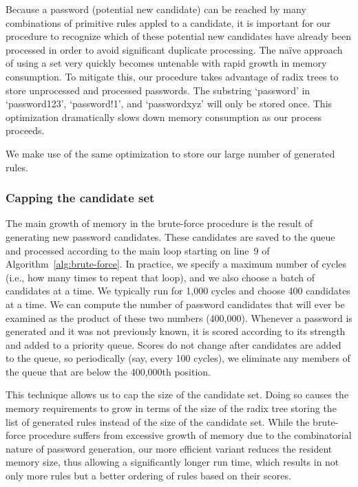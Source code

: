 \documentclass[letterpaper,twocolumn,10pt]{article}
\begin{document}
Because a password (potential new candidate) can be reached by many
combinations of primitive rules appled to a candidate, it is important for our
procedure to recognize which of these potential new candidates have already been
processed in order to avoid significant duplicate processing. The naïve approach
of using a set very quickly becomes untenable with rapid growth in memory
consumption. To mitigate this, our procedure takes advantage of radix trees to
store unprocessed and processed passwords. The substring `password' in
`password123', `password!1', and `passwordxyz' will only be stored once. This
optimization dramatically slows down memory consumption as our process proceeds.

We make use of the same optimization to store our large number of generated
rules.

\subsubsection{Capping the candidate set}

The main growth of memory in the brute-force procedure is the result of
generating new password candidates. These candidates are saved to the queue and
processed according to the main loop starting on line~9 of
Algorithm~\ref{alg:brute-force}. In practice, we specify a maximum number of
cycles (i.e., how many times to repeat that loop), and we also choose a batch
of candidates at a time. We typically run for 1,000 cycles and choose 400
candidates at a time. We can compute the number of password candidates that
will ever be examined as the product of these two numbers (400,000). Whenever a
password is generated and it was not previously known, it is scored according
to its strength and added to a priority queue. Scores do not change after
candidates are added to the queue, so periodically (say, every 100 cycles), we
eliminate any members of the queue that are below the 400,000th position.

This technique allows us to cap the size of the candidate set. Doing so causes
the memory requirements to grow in terms of the size of the radix tree storing
the list of generated rules instead of the size of the candidate set. While the
brute-force procedure suffers from excessive growth of memory due to the
combinatorial nature of password generation, our more efficient variant reduces
the resident memory size, thus allowing a significantly longer run time, which
results in not only more rules but a better ordering of rules based on their
scores.
\end{document}
